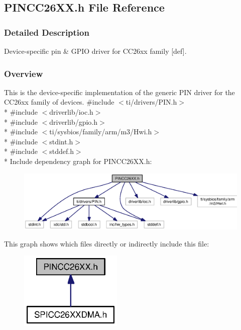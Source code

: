 \subsection{P\-I\-N\-C\-C26\-X\-X.\-h File Reference}
\label{_p_i_n_c_c26_x_x_8h}


\subsubsection{Detailed Description}
Device-\/specific pin \& G\-P\-I\-O driver for C\-C26xx family \mbox{[}def\mbox{]}. 



\subsubsection*{Overview}

This is the device-\/specific implementation of the generic P\-I\-N driver for the C\-C26xx family of devices. {\ttfamily \#include $<$ti/drivers/\-P\-I\-N.\-h$>$}\\*
{\ttfamily \#include $<$driverlib/ioc.\-h$>$}\\*
{\ttfamily \#include $<$driverlib/gpio.\-h$>$}\\*
{\ttfamily \#include $<$ti/sysbios/family/arm/m3/\-Hwi.\-h$>$}\\*
{\ttfamily \#include $<$stdint.\-h$>$}\\*
{\ttfamily \#include $<$stddef.\-h$>$}\\*
Include dependency graph for P\-I\-N\-C\-C26\-X\-X.\-h\-:
\nopagebreak
\begin{figure}[H]
\begin{center}
\leavevmode
\includegraphics[width=350pt]{_p_i_n_c_c26_x_x_8h__incl}
\end{center}
\end{figure}
This graph shows which files directly or indirectly include this file\-:
\nopagebreak
\begin{figure}[H]
\begin{center}
\leavevmode
\includegraphics[width=139pt]{_p_i_n_c_c26_x_x_8h__dep__incl}
\end{center}
\end{figure}
